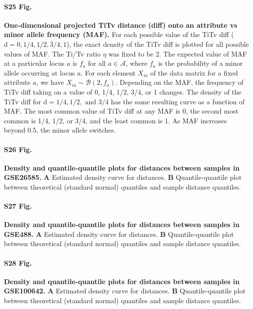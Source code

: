 \documentclass[10pt,letterpaper]{article}
\begin{document}
\paragraph*{S25 Fig.}
\hypertarget{S25_Fig}{
{\bf One-dimensional projected TiTv distance (diff) onto an attribute vs minor allele frequency (MAF).} For each possible value of the TiTv diff ($\text{d} = 0,1/4,1/2,3/4,1$), the exact density of the TiTv diff is plotted for all possible values of MAF. The Ti/Tv ratio $\eta$ was fixed to be 2. The expected value of MAF at a particular locus $a$ is $f_a$ for all $a \in \mathcal{A}$, where $f_a$ is the probability of a minor allele occurring at locus $a$. For each element $X_{ia}$ of the data matrix for a fixed attribute $a$, we have $X_{ia} \sim \mathcal{B}(2,f_a)$. Depending on the MAF, the frequency of TiTv diff taking on a value of 0, 1/4, 1/2, 3/4, or 1 changes. The density of the TiTv diff for $\text{d} = 1/4, 1/2, \text{ and } 3/4$ has the same resulting curve as a function of MAF. The most common value of TiTv diff at any MAF is 0, the second most common is 1/4, 1/2, or 3/4, and the least common is 1. As MAF increases beyond 0.5, the minor allele switches.}

\paragraph*{S26 Fig.}
\hypertarget{S26_Fig}{
{\bf Density and quantile-quantile plots for distances between samples in GSE26585.} \textbf{A} Estimated density curve for distances. \textbf{B} Quantile-quantile plot between theoretical (standard normal) quantiles and sample distance quantiles.}

\paragraph*{S27 Fig.}
\hypertarget{S27_Fig}{
{\bf Density and quantile-quantile plots for distances between samples in GSE488.} \textbf{A} Estimated density curve for distances. \textbf{B} Quantile-quantile plot between theoretical (standard normal) quantiles and sample distance quantiles.}

\paragraph*{S28 Fig.}
\hypertarget{S28_Fig}{
{\bf Density and quantile-quantile plots for distances between samples in GSE100642.} \textbf{A} Estimated density curve for distances. \textbf{B} Quantile-quantile plot between theoretical (standard normal) quantiles and sample distance quantiles.}
\end{document}
